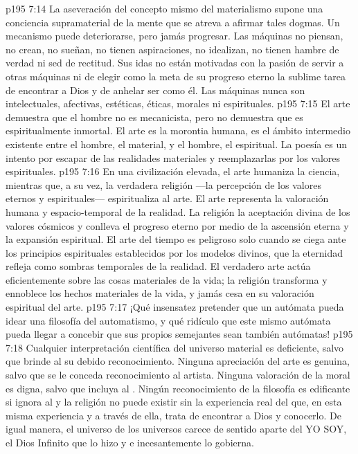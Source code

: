 \vs p195 7:14 \pc La aseveración del concepto mismo del materialismo supone una conciencia supramaterial de la mente que se atreva a afirmar tales dogmas. Un mecanismo puede deteriorarse, pero jamás progresar. Las máquinas no piensan, no crean, no sueñan, no tienen aspiraciones, no idealizan, no tienen hambre de verdad ni sed de rectitud. Sus idas no están motivadas con la pasión de servir a otras máquinas ni de elegir como la meta de su progreso eterno la sublime tarea de encontrar a Dios y de anhelar ser como él. Las máquinas nunca son intelectuales, afectivas, estéticas, éticas, morales ni espirituales.
\vs p195 7:15 El arte demuestra que el hombre no es mecanicista, pero no demuestra que es espiritualmente inmortal. El arte es la morontia humana, es el ámbito intermedio existente entre el hombre, el material, y el hombre, el espiritual. La poesía es un intento por escapar de las realidades materiales y reemplazarlas por los valores espirituales.
\vs p195 7:16 En una civilización elevada, el arte humaniza la ciencia, mientras que, a su vez, la verdadera religión ---la percepción de los valores eternos y espirituales--- espiritualiza al arte. El arte representa la valoración humana y espacio\hyp{}temporal de la realidad. La religión  la aceptación divina de los valores cósmicos y conlleva el progreso eterno por medio de la ascensión eterna y la expansión espiritual. El arte del tiempo es peligroso solo cuando se ciega ante los principios espirituales establecidos por los modelos divinos, que la eternidad refleja como sombras temporales de la realidad. El verdadero arte actúa eficientemente sobre las cosas materiales de la vida; la religión transforma y ennoblece los hechos materiales de la vida, y jamás cesa en su valoración espiritual del arte.
\vs p195 7:17 \pc ¡Qué insensatez pretender que un autómata pueda idear una filosofía del automatismo, y qué ridículo que este mismo autómata pueda llegar a concebir que sus propios semejantes sean también autómatas!
\vs p195 7:18 \pc Cualquier interpretación científica del universo material es deficiente, salvo que brinde al  su debido reconocimiento. Ninguna apreciación del arte es genuina, salvo que se le conceda reconocimiento al artista. Ninguna valoración de la moral es digna, salvo que incluya al . Ningún reconocimiento de la filosofía es edificante si ignora al  y la religión no puede existir sin la experiencia real del  que, en esta misma experiencia y a través de ella, trata de encontrar a Dios y conocerlo. De igual manera, el universo de los universos carece de sentido aparte del YO SOY, el Dios Infinito que lo hizo y e incesantemente lo gobierna.
